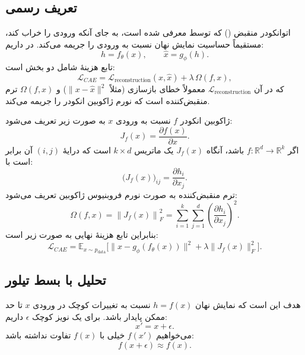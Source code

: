 \documentclass{article}
\begin{document}
\subsection{تعریف رسمی }

اتوانکودر منقبض () که توسط  معرفی شده است، به جای آنکه ورودی را خراب کند، مستقیماً حساسیت نمایش نهان نسبت به ورودی را جریمه می‌کند. در  داریم:
\begin{equation}
	h = f_\theta(x), \qquad \hat{x} = g_\phi(h).
\end{equation}
تابع هزینهٔ  شامل دو بخش است:
\begin{equation}
	\mathcal{L}_{CAE}
	=
	\mathcal{L}_{\text{reconstruction}}(x,\hat{x})
	+
	\lambda \, \Omega(f,x),
\end{equation}
که در آن $\mathcal{L}_{\text{reconstruction}}$ معمولاً خطای بازسازی (مثلاً $\|x-\hat{x}\|^2$) و $\Omega(f,x)$ ترم منقبض‌کننده است که نورم ژاکوبین انکودر را جریمه می‌کند.

ژاکوبین انکودر $f$ نسبت به ورودی $x$ به صورت زیر تعریف می‌شود:
\begin{equation}
	J_f(x)
	=
	\frac{\partial f(x)}{\partial x}.
\end{equation}
اگر $f:\mathbb{R}^d \to \mathbb{R}^k$ باشد، آنگاه $J_f(x)$ یک ماتریس $k \times d$ است که درایهٔ $(i,j)$ آن برابر است با:
\begin{equation}
	\big(J_f(x)\big)_{ij} = \frac{\partial h_i}{\partial x_j}.
\end{equation}
ترم منقبض‌کننده به صورت نورم فروبنیوس ژاکوبین تعریف می‌شود:
\begin{equation}
	\Omega(f,x)
	=
	\left\lVert
	J_f(x)
	\right\rVert_F^2
	=
	\sum_{i=1}^k \sum_{j=1}^d
	\left(
	\frac{\partial h_i}{\partial x_j}
	\right)^2.
\end{equation}
بنابراین تابع هزینهٔ نهایی  به صورت زیر است:
\begin{equation}
	\label{eq:CAE_loss}
	\mathcal{L}_{CAE}
	=
	\mathbb{E}_{x \sim p_{\text{data}}}
	\Big[
	\|x - g_\phi(f_\theta(x))\|^2
	+
	\lambda \|J_f(x)\|_F^2
	\Big].
\end{equation}

\subsection{تحلیل با بسط تیلور}

هدف  این است که نمایش نهان $h = f(x)$ نسبت به تغییرات کوچک در ورودی $x$ تا حد ممکن پایدار باشد. برای یک نویز کوچک $\epsilon$ داریم:
\begin{equation}
	x' = x + \epsilon.
\end{equation}
می‌خواهیم $f(x')$ خیلی با $f(x)$ تفاوت نداشته باشد:
\begin{equation}
	f(x+\epsilon) \approx f(x).
\end{equation}
\end{document}
